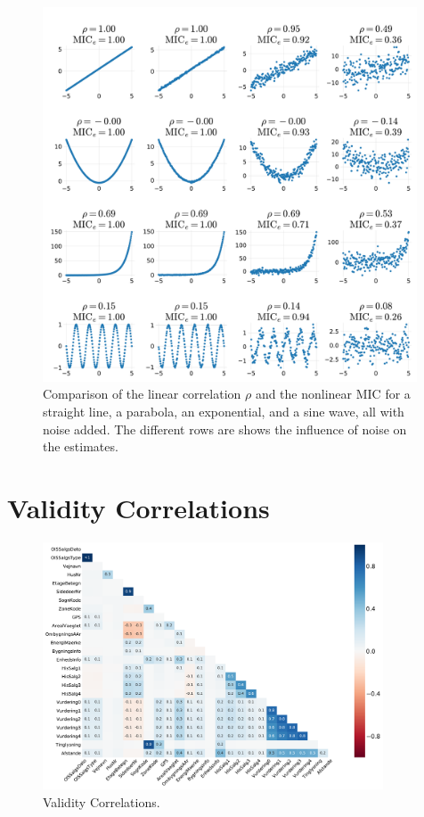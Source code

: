 \begin{figure}[h!]
  \centering
  \includegraphics[draft=false, width=0.99\textwidth, trim=0 0 0 40, clip]{figures/housing/MIC_test.pdf}
  \caption[Comparison of the Linear Correlation $\rho$ and the Nonlinear MIC for Different Levels of Noise]
          {Comparison of the linear correlation $\rho$ and the nonlinear MIC for a straight line, a parabola, an exponential, and a sine wave, all with noise added. The different rows are shows the influence of noise on the estimates.}
  \label{fig:h:MIC_example}
\end{figure}


\FloatBarrier
\section{Validity Correlations}

\begin{figure}[h!]
  \includegraphics[draft=false, width=0.9\textwidth, trim=10 10 10 10, clip]{figures/housing/missing_heatmap.pdf}
  \caption[Validity Heatmap]
          {Validity Correlations.}
  \label{fig:h:nans_heatmap}
\end{figure}


